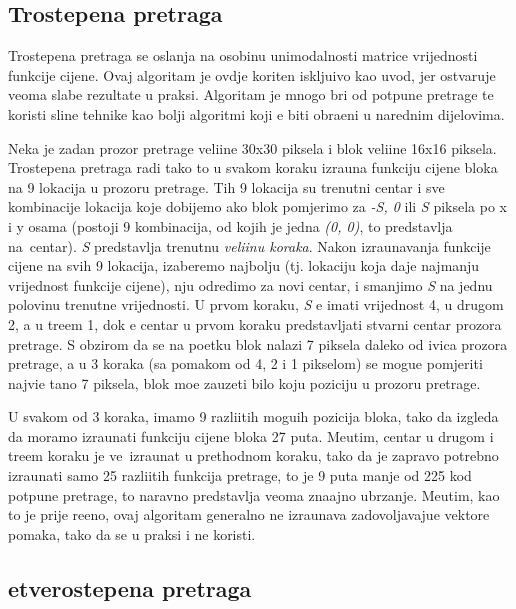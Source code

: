 \subsection{Trostepena pretraga}
Trostepena pretraga se oslanja na osobinu unimodalnosti matrice vrijednosti funkcije cijene. Ovaj algoritam je ovdje kori\sh ten isklju\ch ivo kao uvod, jer ostvaruje veoma slabe rezultate u praksi. Algoritam je mnogo br\zh i
od potpune pretrage te koristi sli\ch ne tehnike kao bolji algoritmi koji \cj e biti obra\dj eni u narednim dijelovima.

Neka je zadan prozor pretrage veli\ch ine 30x30 piksela i blok veli\ch ine 16x16 piksela. Trostepena pretraga radi tako \sh to u svakom koraku izra\ch una funkciju cijene bloka na 9 lokacija u prozoru pretrage. Tih 9 lokacija su
trenutni centar i sve kombinacije lokacija koje dobijemo ako blok pomjerimo za \textit{-S, 0} ili \textit{S} piksela po x i y osama (postoji 9 kombinacija, od kojih je jedna \textit{(0, 0)}, \sh to predstavlja na\sh\ centar).
\textit{S} predstavlja trenutnu \textit{veli\ch inu koraka}. Nakon izra\ch unavanja funkcije cijene na svih 9 lokacija, izaberemo najbolju (tj. lokaciju koja daje najmanju vrijednost funkcije cijene), nju odredimo za novi centar, i 
smanjimo \textit{S} na jednu polovinu trenutne vrijednosti. U prvom koraku, \textit{S} \cj e imati vrijednost 4, u drugom 2, a u tre\cj em 1, dok \cj e centar u prvom koraku predstavljati stvarni centar prozora pretrage. 
S obzirom da se na po\ch etku blok nalazi 7 piksela daleko od ivica prozora pretrage, a u 3 koraka (sa pomakom od 4, 2 i 1 pikselom) se mogu\cj e pomjeriti najvi\sh e ta\ch no 7 piksela, blok mo\zh e zauzeti bilo koju 
poziciju u prozoru pretrage.

U svakom od 3 koraka, imamo 9 razli\ch itih mogu\cj ih pozicija bloka, tako da izgleda da moramo izra\ch unati funkciju cijene bloka 27 puta. Me\dj utim, centar u drugom i tre\cj em koraku je ve\cj\ izra\ch unat u prethodnom
koraku, tako da je zapravo potrebno izra\ch unati samo 25 razli\ch itih funkcija pretrage, \sh to je 9 puta manje od 225 kod potpune pretrage, \sh to naravno predstavlja veoma zna\ch ajno ubrzanje. Me\dj utim, kao \sh to je
prije re\ch eno, ovaj algoritam generalno ne izra\ch unava zadovoljavaju\cj e vektore pomaka, tako da se u praksi i ne koristi.

\subsection{\CH etverostepena pretraga}


